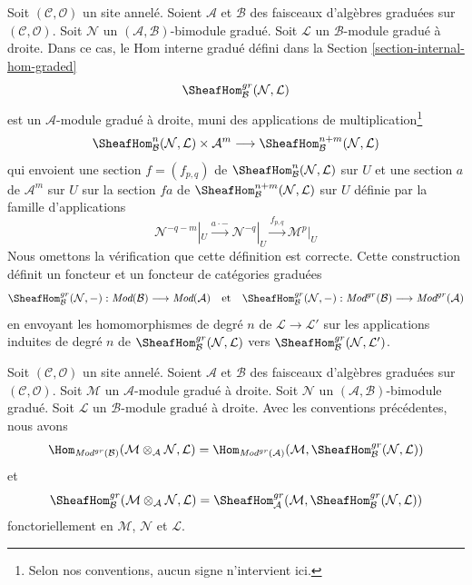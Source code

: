 \medskip\noindent
Soit $(\mathcal{C}, \mathcal{O})$ un site annelé. Soient $\mathcal{A}$
et $\mathcal{B}$ des faisceaux d'algèbres graduées sur
$(\mathcal{C}, \mathcal{O})$. Soit $\mathcal{N}$ un
$(\mathcal{A}, \mathcal{B})$-bimodule gradué. Soit $\mathcal{L}$ un
$\mathcal{B}$-module gradué à droite. Dans ce cas, le Hom interne gradué
défini dans la Section \ref{section-internal-hom-graded}
$$
\SheafHom_\mathcal{B}^{gr}(\mathcal{N}, \mathcal{L})
$$
est un $\mathcal{A}$-module gradué à droite, muni des applications de
multiplication\footnote{Selon nos conventions, aucun signe n'intervient ici.}
$$
\SheafHom^n_\mathcal{B}(\mathcal{N}, \mathcal{L})
\times \mathcal{A}^m
\longrightarrow
\SheafHom^{n + m}_\mathcal{B}(\mathcal{N}, \mathcal{L})
$$
qui envoient une section $f = (f_{p,q})$ de
$\SheafHom^n_\mathcal{B}(\mathcal{N}, \mathcal{L})$ sur $U$ et une section
$a$ de $\mathcal{A}^m$ sur $U$ sur la section $f a$ de
$\SheafHom^{n + m}_\mathcal{B}(\mathcal{N}, \mathcal{L})$ sur $U$ définie
par la famille d'applications
$$
\mathcal{N}^{-q - m}|_U \xrightarrow{a \cdot -}
\mathcal{N}^{-q}|_U \xrightarrow{f_{p, q}}
\mathcal{M}^p|_U
$$
Nous omettons la vérification que cette définition est correcte. Cette
construction définit un foncteur et un foncteur de catégories graduées
$$
\SheafHom_\mathcal{B}^{gr}(\mathcal{N}, -) :
\textit{Mod}(\mathcal{B})
\longrightarrow
\textit{Mod}(\mathcal{A})
\quad\text{et}\quad
\SheafHom_\mathcal{B}^{gr}(\mathcal{N}, -) :
\textit{Mod}^{gr}(\mathcal{B})
\longrightarrow
\textit{Mod}^{gr}(\mathcal{A})
$$
en envoyant les homomorphismes de degré $n$ de
$\mathcal{L} \to \mathcal{L}'$ sur les applications induites de degré $n$
de $\SheafHom_\mathcal{B}^{gr}(\mathcal{N}, \mathcal{L})$ vers
$\SheafHom_\mathcal{B}^{gr}(\mathcal{N}, \mathcal{L}')$.

\begin{lemma}
\label{lemma-tensor-hom-adjunction-gr}
Soit $(\mathcal{C}, \mathcal{O})$ un site annelé. Soient $\mathcal{A}$
et $\mathcal{B}$ des faisceaux d'algèbres graduées sur
$(\mathcal{C}, \mathcal{O})$. Soit $\mathcal{M}$ un
$\mathcal{A}$-module gradué à droite. Soit $\mathcal{N}$ un
$(\mathcal{A}, \mathcal{B})$-bimodule gradué. Soit $\mathcal{L}$ un
$\mathcal{B}$-module gradué à droite. Avec les conventions précédentes,
nous avons
$$
\Hom_{\textit{Mod}^{gr}(\mathcal{B})}(
\mathcal{M} \otimes_\mathcal{A} \mathcal{N}, \mathcal{L}) =
\Hom_{\textit{Mod}^{gr}(\mathcal{A})}(
\mathcal{M}, \SheafHom_\mathcal{B}^{gr}(\mathcal{N}, \mathcal{L}))
$$
et
$$
\SheafHom_\mathcal{B}^{gr}(
\mathcal{M} \otimes_\mathcal{A} \mathcal{N}, \mathcal{L}) =
\SheafHom_\mathcal{A}^{gr}(
\mathcal{M}, \SheafHom_\mathcal{B}^{gr}(\mathcal{N}, \mathcal{L}))
$$
fonctoriellement en $\mathcal{M}$, $\mathcal{N}$ et $\mathcal{L}$.
\end{lemma}

